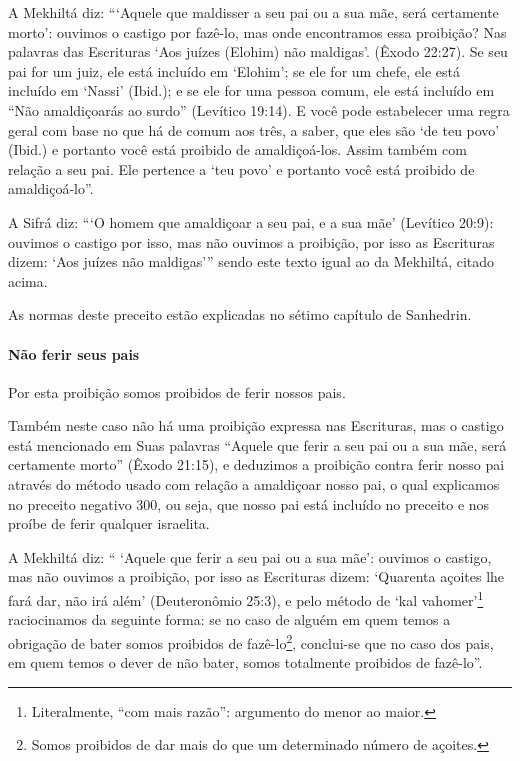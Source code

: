 A Mekhiltá diz: ```Aquele que maldisser a seu pai ou a sua mãe, será
certamente morto': ouvimos o castigo por fazê-lo, mas onde encontramos
essa proibição? Nas palavras das Escrituras `Aos juízes (Elohim) não
maldigas'. (Êxodo 22:27). Se seu pai for um juiz, ele está incluído em
`Elohim'; se ele for um chefe, ele está incluído em
`Nassi' (Ibid.); e se ele for uma pessoa comum, ele está incluído em
``Não amaldiçoarás ao surdo'' (Levítico 19:14). E você pode estabelecer
uma regra geral com base no que há de comum aos três, a saber, que eles
são `de teu povo' (Ibid.) e portanto você está proibido de
amaldiçoá-los. Assim também com relação a seu pai. Ele pertence a `teu
povo' e portanto você está proibido de amaldiçoá-lo''.

A Sifrá diz: ```O homem que amaldiçoar a seu pai, e a sua mãe' (Levítico
20:9): ouvimos o castigo por isso, mas não ouvimos a proibição, por isso
as Escrituras dizem: `Aos juízes não maldigas''' sendo este texto igual
ao da Mekhiltá, citado acima.

As normas deste preceito estão explicadas no sétimo capítulo de Sanhedrin.

\paragraph{Não ferir seus pais}

Por esta proibição somos proibidos de ferir nossos pais.

Também neste caso não há uma proibição expressa nas Escrituras, mas o
castigo está mencionado em Suas palavras ``Aquele que ferir a seu pai ou
a sua mãe, será certamente morto'' (Êxodo 21:15), e deduzimos a
proibição contra ferir nosso pai através do método usado com relação a
amaldiçoar nosso pai, o qual explicamos no preceito negativo 300, ou
seja, que nosso pai está incluído no preceito e nos proíbe de ferir
qualquer israelita.

A Mekhiltá diz: `` `Aquele que ferir a seu pai ou a sua mãe': ouvimos o
castigo, mas não ouvimos a proibição, por isso as Escrituras dizem:
`Quarenta açoites lhe fará dar, não irá além' (Deuteronômio 25:3), e
pelo método de `kal vahomer'\footnote{Literalmente, ``com mais razão'': argumento do menor ao maior.} raciocinamos da
seguinte forma: se no caso de alguém em quem temos a obrigação de bater
somos proibidos de fazê-lo\footnote{Somos proibidos de dar mais do que um determinado número de açoites.}, conclui-se que no caso
dos pais, em quem temos o dever de não bater, somos totalmente
proibidos de fazê-lo''.

